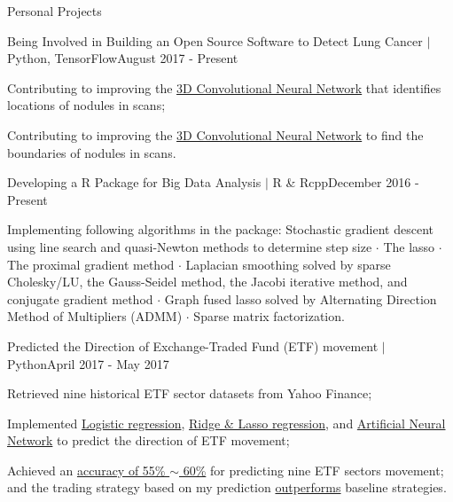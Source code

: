 \documentclass{my_resume} %
\begin{document}
\begin{rSection}{Personal Projects}
  \begin{rSubsection}{Being Involved in Building an Open Source Software to
      Detect Lung Cancer $|$ Python, TensorFlow}{}{August 2017 - Present}
    \item Contributing to improving the \underline{3D Convolutional Neural Network} that identifies
    locations of nodules in scans;
  \item Contributing to improving the \underline{3D Convolutional Neural Network} to find the
    boundaries of nodules in scans.
  \end{rSubsection}

  \begin{rSubsection}{Developing a R Package for Big Data Analysis $|$ R \&
    Rcpp}{}{December 2016 - Present}
  \item Implementing following algorithms in the package: Stochastic gradient
    descent using line search and quasi-Newton methods to determine step size
    {$\cdot$} The lasso {$\cdot$} The proximal gradient method {$\cdot$}
    Laplacian smoothing solved by sparse Cholesky/LU, the Gauss-Seidel method,
    the Jacobi iterative method, and conjugate gradient method {$\cdot$} Graph
    fused lasso solved by Alternating Direction Method of Multipliers (ADMM)
    {$\cdot$} Sparse matrix factorization.
  \end{rSubsection}

  \begin{rSubsection}{Predicted the Direction of Exchange-Traded Fund
    (ETF) movement $|$ Python}{}{April 2017 - May 2017}
  \item Retrieved nine historical ETF sector datasets from Yahoo Finance;
  \item Implemented \underline{Logistic regression}, \underline{Ridge \& Lasso
    regression}, and \underline{Artificial Neural Network} to predict the
    direction of ETF movement;
  \item Achieved an \underline{accuracy of 55\% $\sim$ 60\%} for predicting
    nine ETF sectors movement; and the trading strategy based on my prediction
    \underline{outperforms} baseline strategies.
  \end{rSubsection}



\end{rSection}
\end{document}
